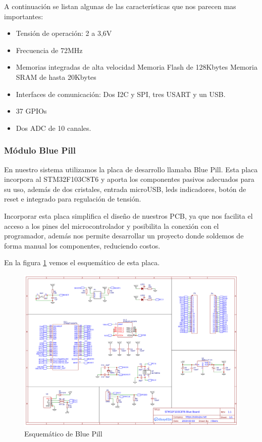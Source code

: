 A continuación se listan algunas de las características que nos parecen mas importantes:

\begin{itemize}
    \item Tensión de operación: 2 a 3,6V
    \item Frecuencia de 72MHz
    \item Memorias integradas de alta velocidad
    \subitem Memoria Flash de 128Kbytes
    \subitem Memoria SRAM de hasta 20Kbytes
    \item Interfaces de comunicación: Dos I2C y SPI, tres USART y un USB.
    \item 37 GPIOs
    \item Dos ADC de 10 canales.
\end{itemize}

\subsubsection{Módulo Blue Pill}

En nuestro sistema utilizamos la placa de desarrollo llamaba Blue Pill. Esta placa incorpora al STM32F103C8T6 y aporta los componentes pasivos
adecuados para su uso, además de dos cristales, entrada microUSB, leds indicadores, botón de reset e integrado para regulación de tensión. \par
Incorporar esta placa simplifica el diseño de nuestros PCB, ya que nos facilita el acceso a los pines del microcontrolador y posibilita la conexión
con el programador, además nos permite desarrollar un proyecto donde soldemos de forma manual los componentes, reduciendo costos.\par
En la figura \ref{fig:sch_bluepill} vemos el esquemático de esta placa.

\begin{figure}[htb]
	\centering
	\includegraphics[scale=0.4]{images/esquematico_bluepill.png}
    \caption{Esquemático de Blue Pill}
	\label{fig:sch_bluepill}
\end{figure}
